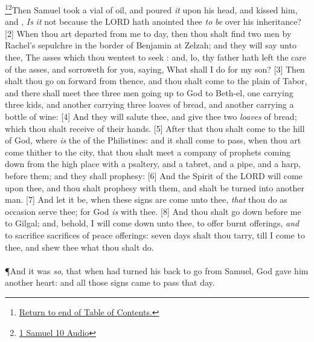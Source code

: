 \footnote{\textcolor[cmyk]{0.99998,1,0,0}{\hyperlink{TOC}{Return to end of Table of Contents.}}}\footnote{\href{https://audiobible.com/bible/1_samuel_10.html}{\textcolor[cmyk]{0.99998,1,0,0}{1 Samuel 10 Audio}}}\textcolor[cmyk]{0.99998,1,0,0}{Then Samuel took a vial of oil, and poured \emph{it} upon his head, and kissed him, and , \emph{Is} \emph{it} not because the LORD hath anointed thee \emph{to} \emph{be}  over his inheritance?}
[2] \textcolor[cmyk]{0.99998,1,0,0}{When thou art departed from me to day, then thou shalt find two men by Rachel's sepulchre in the border of Benjamin at Zelzah; and they will say unto thee, The asses which thou wentest to seek : and, lo, thy father hath left the care of the asses, and sorroweth for you, saying, What shall I do for my son?}
[3] \textcolor[cmyk]{0.99998,1,0,0}{Then shalt thou go on forward from thence, and thou shalt come to the plain of Tabor, and there shall meet thee three men going up to God to Beth-el, one carrying three kids, and another carrying three loaves of bread, and another carrying a bottle of wine:}
[4] \textcolor[cmyk]{0.99998,1,0,0}{And they will salute thee, and give thee two \emph{loaves} of bread; which thou shalt receive of their hands.}
[5] \textcolor[cmyk]{0.99998,1,0,0}{After that thou shalt come to the hill of God, where \emph{is} the  of the Philistines: and it shall come to pass, when thou art come thither to the city, that thou shalt meet a company of prophets coming down from the high place with a psaltery, and a tabret, and a pipe, and a harp, before them; and they shall prophesy:}
[6] \textcolor[cmyk]{0.99998,1,0,0}{And the Spirit of the LORD will come upon thee, and thou shalt prophesy with them, and shalt be turned into another man.}
[7] \textcolor[cmyk]{0.99998,1,0,0}{And let it be, when these signs are come unto thee, \emph{that} thou do as occasion serve thee; for God \emph{is} with thee.}
[8] \textcolor[cmyk]{0.99998,1,0,0}{And thou shalt go down before me to Gilgal; and, behold, I will come down unto thee, to offer burnt offerings, \emph{and} to sacrifice sacrifices of peace offerings: seven days shalt thou tarry, till I come to thee, and shew thee what thou shalt do.}\\
\\
\P \textcolor[cmyk]{0.99998,1,0,0}{And it was \emph{so}, that when  had turned his back to go from Samuel, God gave him another heart: and all those signs came to pass that day.}

